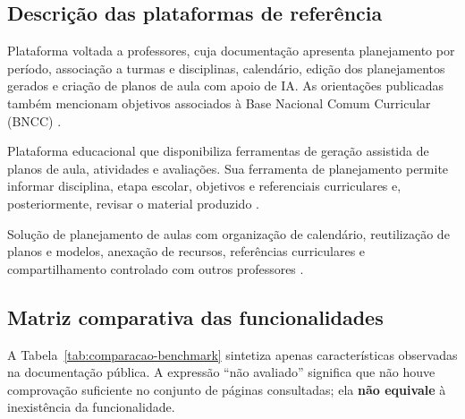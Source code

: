 \documentclass[12pt,a4paper,oneside]{report}
\begin{document}
\subsection{Descrição das plataformas de referência}
\begin{description}[leftmargin=!,labelwidth=3cm]
  \item[Teachy.] Plataforma voltada a professores, cuja documentação apresenta planejamento por período, associação a turmas e disciplinas, calendário, edição dos planejamentos gerados e criação de planos de aula com apoio de IA. As orientações publicadas também mencionam objetivos associados à Base Nacional Comum Curricular (BNCC) \citep{teachy_planejamento2026,teachy_ferramentas2026}.
  \item[MagicSchool AI.] Plataforma educacional que disponibiliza ferramentas de geração assistida de planos de aula, atividades e avaliações. Sua ferramenta de planejamento permite informar disciplina, etapa escolar, objetivos e referenciais curriculares e, posteriormente, revisar o material produzido \citep{magicschool_planos2026,magicschool_ferramentas2026}.
  \item[Planbook.] Solução de planejamento de aulas com organização de calendário, reutilização de planos e modelos, anexação de recursos, referências curriculares e compartilhamento controlado com outros professores \citep{planbook_professores2026}.
\end{description}

\subsection{Matriz comparativa das funcionalidades}
A Tabela~\ref{tab:comparacao-benchmark} sintetiza apenas características observadas na documentação pública. A expressão ``não avaliado'' significa que não houve comprovação suficiente no conjunto de páginas consultadas; ela \textbf{não equivale} à inexistência da funcionalidade.
\end{document}
